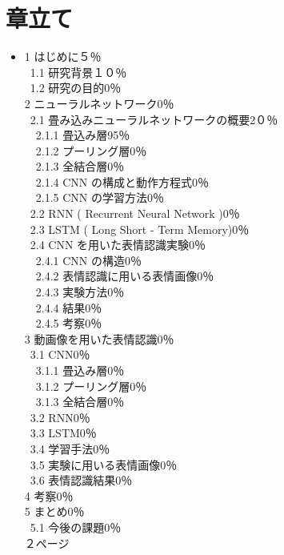 \section{章立て}
\begin{itemize}
\item 1 はじめに５％\\
  \ 1.1 研究背景１０％\\
  \ 1.2 研究の目的0％\\
  2 ニューラルネットワーク0％\\
  \ 2.1 畳み込みニューラルネットワークの概要2０％\\
  \ \ 2.1.1 畳込み層95％\\
  \ \ 2.1.2 プーリング層0％\\
  \ \ 2.1.3 全結合層0％\\
  \ \ 2.1.4 CNN の構成と動作方程式0％\\
  \ \ 2.1.5 CNN の学習方法0％\\
  \ 2.2 RNN ( Recurrent Neural Network )0％\\
  \ 2.3 LSTM ( Long Short - Term Memory)0％\\
  \ 2.4 CNN を用いた表情認識実験0％\\
  \ \ 2.4.1 CNN の構造0％\\
  \ \ 2.4.2 表情認識に用いる表情画像0％\\
  \ \ 2.4.3 実験方法0％\\
  \ \ 2.4.4 結果0％\\
  \ \ 2.4.5 考察0％\\
  3 動画像を用いた表情認識0％\\
  \ 3.1 CNN0％\\
  \ \ 3.1.1 畳込み層0％\\
  \ \ 3.1.2 プーリング層0％\\
  \ \ 3.1.3 全結合層0％\\
  \ 3.2 RNN0％\\
  \ 3.3 LSTM0％\\
  \ 3.4 学習手法0％\\
  \ 3.5 実験に用いる表情画像0％\\
  \ 3.6 表情認識結果0％\\
  4 考察0％\\
  5 まとめ0％\\
  \ 5.1 今後の課題0％\\
  ２ページ
\end{itemize}

